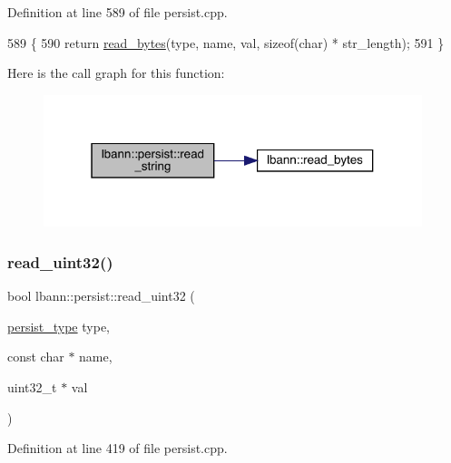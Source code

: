 Definition at line 589 of file persist.\+cpp.


\begin{DoxyCode}
589                                                                                              \{
590   \textcolor{keywordflow}{return} \hyperlink{classlbann_1_1persist_af24f635f634c8cf30cf53a0e90ec641b}{read\_bytes}(type, name, val, \textcolor{keyword}{sizeof}(\textcolor{keywordtype}{char}) * str\_length);
591 \}
\end{DoxyCode}
Here is the call graph for this function\+:\nopagebreak
\begin{figure}[H]
\begin{center}
\leavevmode
\includegraphics[width=313pt]{classlbann_1_1persist_a19c0a5dbee697aff0a5a5588f2d370b9_cgraph}
\end{center}
\end{figure}
\mbox{\label{classlbann_1_1persist_ace1ebb58e2570693cdce0ebd2817113b}} 
\subsubsection{\texorpdfstring{read\+\_\+uint32()}{read\_uint32()}}
{\footnotesize\ttfamily bool lbann\+::persist\+::read\+\_\+uint32 (\begin{DoxyParamCaption}\item[{\hyperlink{namespacelbann_adee41f31f15f3906cbdcce4a1417eb56}{persist\+\_\+type}}]{type,  }\item[{const char $\ast$}]{name,  }\item[{uint32\+\_\+t $\ast$}]{val }\end{DoxyParamCaption})}



Definition at line 419 of file persist.\+cpp.


